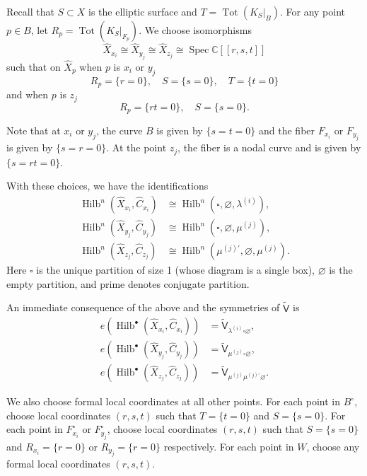 \documentclass[12pt]{amsart}
\theoremstyle{definition}
\newcommand{\CC} {\mathbb{C}}          %
\newcommand{\sfVtilde}{\widetilde{\mathsf{V}}}
\newcommand{\Hilb}{\operatorname{Hilb}}
\newcommand{\Tot}{\operatorname{Tot}}
\newcommand{\Spec}{\operatorname{Spec}}
\renewcommand{\emptyset}{\varnothing}
\renewcommand{\hat}{\widehat}
\newcommand{\Xhat}{\widehat{X}}
\newcommand{\bx}{\square}
\newcommand{\mujprime}{\mu^{(j)\prime}}
\begin{document}
Recall that $S\subset X$ is the elliptic surface and $T=\Tot
(K_{S}|_{B}).$ For any point $p\in B$, let $R_{p} =\Tot
(K_{S}|_{F_{p}})$. We choose isomorphisms 
\[
\Xhat_{x_{i}} \cong \Xhat_{y_{j}} \cong \Xhat_{z_{j}} \cong \Spec \CC [[r,s,t]]
\]
such that on $\Xhat_{p}$ when $p$ is $x_{i}$ or $y_{j}$
\[
R_{p} = \{r=0 \},\quad S=\{s=0 \}, \quad T=\{t=0 \}
\]
and when $p$ is $z_{j}$ 
\[
R_{p}=\{rt=0 \}, \quad S=\{s=0 \}.
\]

Note that at $x_{i}$ or $y_{j}$, the curve $B$ is given by $\{s=t=0
\}$ and the fiber $F_{x_{i}}$ or $F_{y_{j}}$ is given by $\{s=r=0
\}$. At the point $z_{j}$, the fiber is a nodal curve and is given by
$\{s=rt=0 \}$.

With these choices, we have the identifications
\begin{align*}
\Hilb^{n}\left(\Xhat_{x_{i}},\hat{C}_{x_{i}} \right)&\cong
\Hilb^{n}\left(\bx ,\emptyset ,\lambda^{(i)} \right),\\
\Hilb^{n}\left(\Xhat_{y_{j}},\hat{C}_{y_{j}} \right)&\cong
\Hilb^{n}\left(\bx ,\emptyset ,\mu^{(j)} \right),\\
\Hilb^{n}\left(\Xhat_{z_{j}},\hat{C}_{z_{j}} \right)&\cong
\Hilb^{n}\left(\mujprime ,\emptyset ,\mu^{(j)} \right).
\end{align*}
Here $\bx$ is the unique partition of size 1 (whose diagram is a
single box), $\emptyset$ is the empty partition, and prime denotes
conjugate partition. 

An immediate consequence of the above and the symmetries of
$\sfVtilde$ is 
\begin{align}\label{eqn: e(Hilb(Xhat,Chat)=vertex}
e\left(\Hilb^{\bullet}\left(\Xhat_{x_{i}},\hat{C}_{x_{i}} \right) \right)&=
\sfVtilde_{\lambda^{(i)} \bx  \emptyset }, \\
e\left(\Hilb^{\bullet}\left(\Xhat_{y_{j}},\hat{C}_{y_{j}} \right) \right)&=
\sfVtilde_{ \mu^{(j)} \bx \emptyset }, \nonumber \\
e\left(\Hilb^{\bullet}\left(\Xhat_{z_{j}},\hat{C}_{z_{j}} \right) \right)&=
\sfVtilde_{\mu^{(j)} \mujprime \emptyset  }. \nonumber
\end{align}




We also choose formal local coordinates at all other points. For each
point in $B^{\circ}$, choose local coordinates $(r,s,t)$ such that
$T=\{t=0 \}$ and $S=\{s=0 \}$. For each point in $F^{\circ}_{x_{i}}$
or $F^{\circ}_{y_{j}}$, choose local coordinates $(r,s,t)$ such that
$S=\{s=0 \}$ and $R_{x_{i}}=\{r=0 \}$ or $R_{y_{j}}=\{r=0 \}$
respectively. For each point in $W$, choose any formal local
coordinates $(r,s,t)$.
\end{document}
